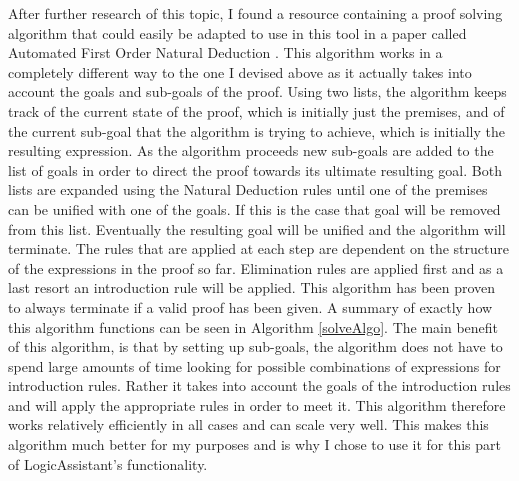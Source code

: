 After further research of this topic, I found a resource containing a proof solving algorithm that could easily be adapted to use in this tool in a paper called Automated First Order Natural Deduction \cite{ndAlgo}.  This algorithm works in a completely different way to the one I devised above as it actually takes into account the goals and sub-goals of the proof. Using two lists, the algorithm keeps track of the current state of the proof, which is initially just the premises, and of the current sub-goal that the algorithm is trying to achieve, which is initially the resulting expression. As the algorithm proceeds new sub-goals are added to the list of goals in order to direct the proof towards its ultimate resulting goal. Both lists are expanded using the Natural Deduction rules until one of the premises can be unified with one of the goals. If this is the case that goal will be removed from this list. Eventually the resulting goal will be unified and the algorithm will terminate. The rules that are applied at each step are dependent on the structure of the expressions in the proof so far. Elimination rules are applied first and as a last resort an introduction rule will be applied. This algorithm has been proven to always terminate if a valid proof has been given. A summary of exactly how this algorithm functions can be seen in Algorithm \ref{solveAlgo}. The main benefit of this algorithm, is that by setting up sub-goals, the algorithm does not have to spend large amounts of time looking for possible combinations of expressions for introduction rules. Rather it takes into account the goals of the introduction rules and will apply the appropriate rules in order to meet it. This algorithm therefore works relatively efficiently in all cases and can scale very well. This makes this algorithm much better for my purposes and is why I chose to use it for this part of LogicAssistant's functionality. 

